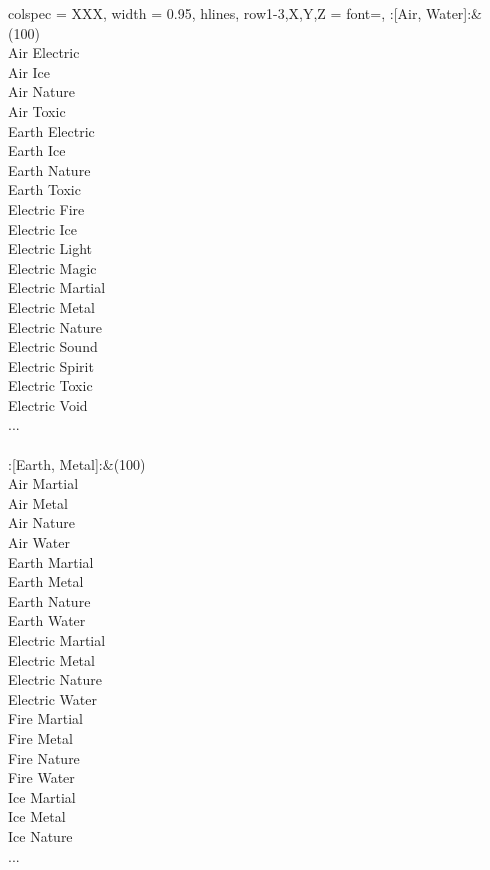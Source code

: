 \begin{longtblr}[
	caption = {2v2 Defending Weak},
	label = {2v2-Defending-Weak},
]{
	colspec = {XXX}, width = 0.95\linewidth,
	hlines,
	row{1-3,X,Y,Z} = {font=\bfseries},
}
	:[Air, Water]:&{(100)\\
	Air Electric \\
	Air Ice \\
	Air Nature \\
	Air Toxic \\
	Earth Electric \\
	Earth Ice \\
	Earth Nature \\
	Earth Toxic \\
	Electric Fire \\
	Electric Ice \\
	Electric Light \\
	Electric Magic \\
	Electric Martial \\
	Electric Metal \\
	Electric Nature \\
	Electric Sound \\
	Electric Spirit \\
	Electric Toxic \\
	Electric Void \\
	...\\
	}\\

	:[Earth, Metal]:&{(100)\\
	Air Martial \\
	Air Metal \\
	Air Nature \\
	Air Water \\
	Earth Martial \\
	Earth Metal \\
	Earth Nature \\
	Earth Water \\
	Electric Martial \\
	Electric Metal \\
	Electric Nature \\
	Electric Water \\
	Fire Martial \\
	Fire Metal \\
	Fire Nature \\
	Fire Water \\
	Ice Martial \\
	Ice Metal \\
	Ice Nature \\
	...\\
	}\\


\end{longtblr}
